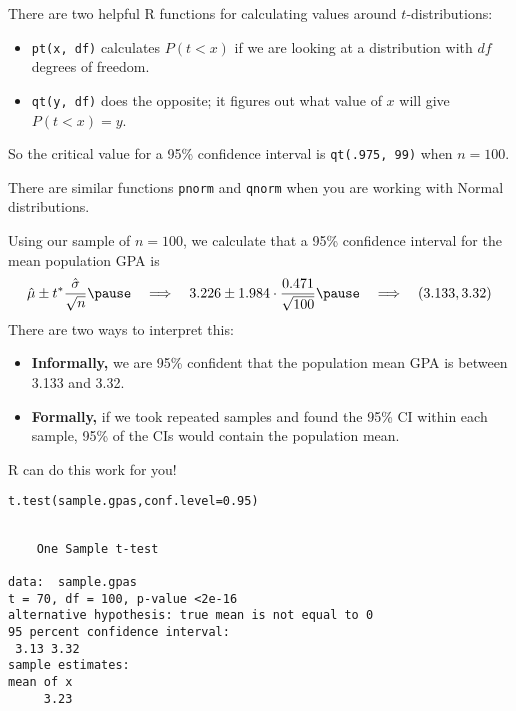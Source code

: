 \documentclass{beamer}\usepackage[]{graphicx}\usepackage[]{color}
\makeatletter
\newcommand{\hlnum}[1]{\textcolor[rgb]{0.824,0.412,0.118}{#1}}%
\newcommand{\hlstd}[1]{\textcolor[rgb]{1,0.894,0.769}{#1}}%
\newcommand{\hlkwc}[1]{\textcolor[rgb]{0.78,0.941,0.545}{#1}}%
\newcommand{\hlkwd}[1]{\textcolor[rgb]{1,0.78,0.769}{#1}}%
\newenvironment{kframe}{%
 \def\at@end@of@kframe{}%
 \ifinner\ifhmode%
  \def\at@end@of@kframe{\end{minipage}}%
  \begin{minipage}{\columnwidth}%
 \fi\fi%
 \def\FrameCommand##1{\hskip\@totalleftmargin \hskip-\fboxsep
 \colorbox{shadecolor}{##1}\hskip-\fboxsep
     \hskip-\linewidth \hskip-\@totalleftmargin \hskip\columnwidth}%
 \MakeFramed {\advance\hsize-\width
   \@totalleftmargin\z@ \linewidth\hsize
   \@setminipage}}%
 {\par\unskip\endMakeFramed%
 \at@end@of@kframe}
\newenvironment{knitrout}{}{} %
\makeatother
\begin{document}
\begin{darkframes}
\begin{frame}
\begin{knitrout}
\end{knitrout}
\end{frame}


\begin{frame}[fragile]
There are two helpful R functions for calculating values around $t$-distributions:
\begin{itemize}[<+->]
  \item \verb|pt(x, df)| calculates $P(t<x)$ if we are looking at a distribution with $df$ degrees of freedom. \pause
  \item \verb|qt(y, df)| does the opposite; it figures out what value of $x$ will give $P(t<x)=y$. \pause
\end{itemize}
So the critical value for a 95\% confidence interval is \verb|qt(.975, 99)| when $n=100$. \pause\bigskip

There are similar functions \verb|pnorm| and \verb|qnorm| when you are working with Normal distributions.
\end{frame}

\begin{frame}
Using our sample of $n=100$, we calculate that a 95\% confidence interval for the mean population GPA is
\[
  \hat\mu \pm t^* \frac{\hat\sigma}{\sqrt n}
  \pause\quad\Longrightarrow\quad
  3.226 \pm 1.984\cdot\frac{0.471}{\sqrt{100}}
  \pause\quad\Longrightarrow\quad
  (3.133, 3.32)
\]
\pause
There are two ways to interpret this:
\begin{itemize}
  \item \textbf{Informally,} we are 95\% confident that the population mean GPA is between 3.133 and 3.32. \pause
  \item \textbf{Formally,} if we took repeated samples and found the 95\% CI within each sample, 95\% of the CIs would contain the population mean.
\end{itemize}
\end{frame}


\begin{frame}[fragile]
R can do this work for you!
\begin{knitrout}
\begin{kframe}
\begin{alltt}
\hlkwd{t.test}\hlstd{(sample.gpas,} \hlkwc{conf.level}\hlstd{=}\hlnum{0.95}\hlstd{)}
\end{alltt}
\begin{verbatim}

	One Sample t-test

data:  sample.gpas
t = 70, df = 100, p-value <2e-16
alternative hypothesis: true mean is not equal to 0
95 percent confidence interval:
 3.13 3.32
sample estimates:
mean of x 
     3.23 
\end{verbatim}
\end{kframe}
\end{knitrout}
\end{frame}



\end{darkframes}
\end{document}
